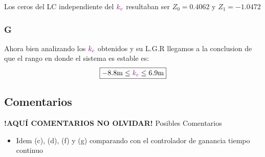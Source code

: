 Los ceros del LC independiente del \(\mathbin{\color{violet}k_c}\) resultaban ser $Z_{0} = 0.4062 $ y $Z_{1} = -1.0472$ 



\FloatBarrier
\subsubsection{G}%

Ahora bien analizando los \(\mathbin{\color{violet}k_c}\) obtenidos y su L.G.R llegamos a la
conclusion de que el rango en donde el sistema es estable es:
\begin{equation}
  \boxed{ -8.8\unit{m} \leq \mora{k_{c}} \leq 6.9\unit{m} }
\end{equation}

\FloatBarrier
\subsection{Comentarios}


\textbf{!AQUÍ COMENTARIOS NO OLVIDAR!}
Posibles Comentarios
\begin{itemize}
    \item Idem (c), (d), (f) y (g) comparando con el controlador de ganancia tiempo continuo
\end{itemize}
